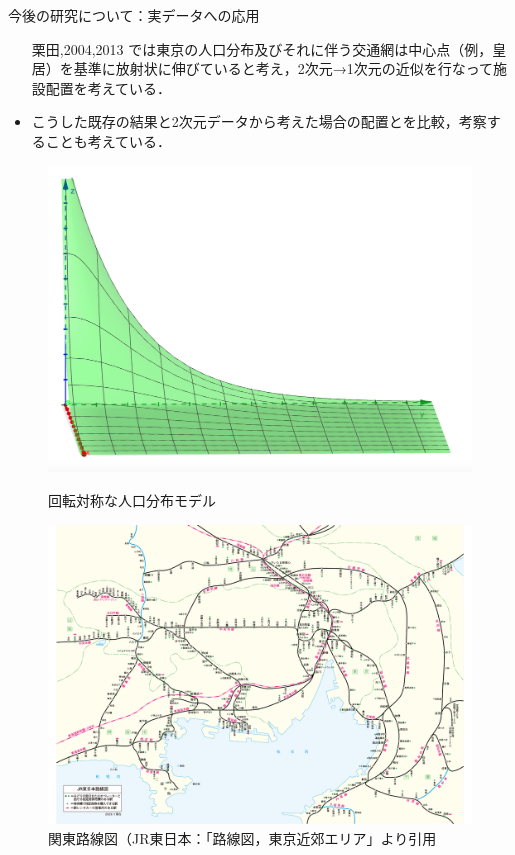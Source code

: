 \documentclass[unicode,11pt]{beamer}
\begin{document}
\begin{frame}{今後の研究について：実データへの応用}
    \begin{itemize}
        \item [栗田,2004,2013]では東京の人口分布及びそれに伴う交通網は中心点（例，皇居）を基準に放射状に伸びていると考え，2次元→1次元の近似を行なって施設配置を考えている．
        \item こうした既存の結果と2次元データから考えた場合の配置とを比較，考察することも考えている．
    \end{itemize}
    \begin{figure}[htbp]
        \begin{minipage}[b]{0.45\linewidth}
            \centering
            \includegraphics[keepaspectratio, scale=0.15]{z=e-u.png}
            \caption{回転対称な人口分布モデル}
        \end{minipage}
        \begin{minipage}[b]{0.45\linewidth}
            \centering
            \includegraphics[keepaspectratio, scale=0.15]{tokyo.pdf}
            \caption{関東路線図（JR東日本：「路線図，東京近郊エリア」より引用}
        \end{minipage}
    \end{figure}
\end{frame}
\end{document}
